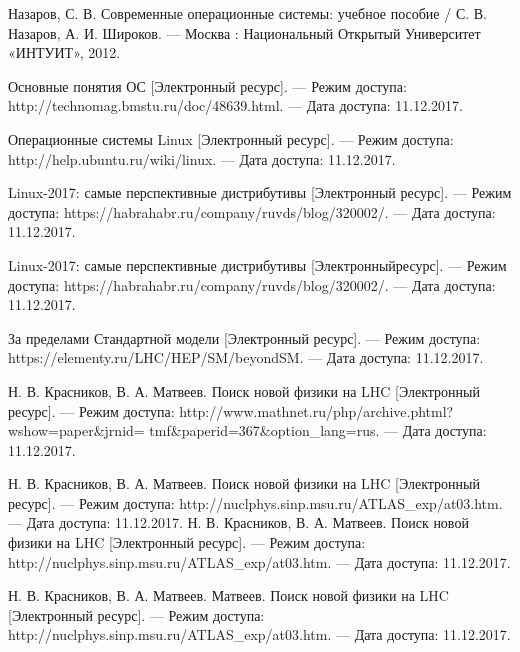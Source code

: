

	Назаров, С. В. 
	Современные операционные системы: учебное пособие 
	/ С. В. Назаров, А. И. Широков. 
	— Москва : Национальный Открытый Университет «ИНТУИТ», 2012.

	Основные понятия ОС 
	[Электронный ресурс].
	 — Режим досту­па: http://technomag.bmstu.ru/doc/48639.html.
	 — Дата доступа: 11.12.2017.

	Операционные системы Linux 
	[Электронный ресурс].
	 — Ре­жим доступа: http://help.ubuntu.ru/wiki/linux.
	 — Дата доступа: 11.12.2017.
	 
	 Linux-2017: самые перспективные дистрибутивы  
	 [Электронный ресурс].
	 — Ре­жим доступа: https://habrahabr.ru/company/ruvds/blog/320002/.
	 — Дата доступа: 11.12.2017.

	Linux-2017: самые перспективные дистрибутивы 
	[Электронныйресурс].
	 — Режим доступа: https://habrahabr.ru/company/ruvds/blog/320002/.
	 — Дата доступа: 11.12.2017.

	За пределами Стандартной модели
	[Электронный ресурс].
	 — Режим доступа: https://elementy.ru/LHC/HEP/SM/beyondSM. 
	 — Да­та доступа: 11.12.2017.

	Н. В. Красников, В. А. Матвеев. 
	Поиск новой фи­зики на LHC 
	[Электронный ресурс].
	 — Режим доступа:
	http://www.mathnet.ru/php/archive.phtml?wshow=paper\&jrnid=
	tmf\&paperid=367\&option\_lang=rus.
	 — Дата доступа: 11.12.2017.


	Н. В. Красников, В. А. 
	Матвеев. Поиск новой физики на LHC
	[Электронный ресурс].
	 — Режим доступа: http://nuclphys.sinp.msu.ru/ATLAS\_exp/at03.htm. 
	 — Дата доступа: 11.12.2017.
	Н. В. Красников, В. А. 
	Матвеев. Поиск новой физики на LHC
	[Электронный ресурс].
	— Режим доступа: http://nuclphys.sinp.msu.ru/ATLAS\_exp/at03.htm. 
	— Дата доступа: 11.12.2017.
	 
	Н. В. Красников, В. А. Матвеев. 
	Матвеев. Поиск новой физики на LHC
	[Электронный ресурс].
	— Режим доступа: http://nuclphys.sinp.msu.ru/ATLAS\_exp/at03.htm. 
	— Дата доступа: 11.12.2017.




